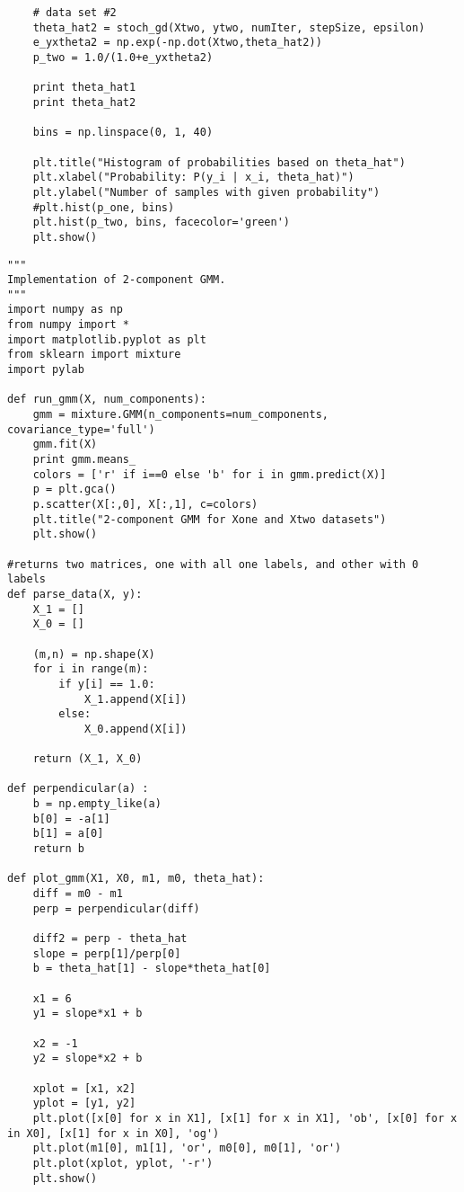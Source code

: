 \documentclass[11pt]{article}
\begin{document}
\begin{lstlisting}
    # data set #2
    theta_hat2 = stoch_gd(Xtwo, ytwo, numIter, stepSize, epsilon)
    e_yxtheta2 = np.exp(-np.dot(Xtwo,theta_hat2))
    p_two = 1.0/(1.0+e_yxtheta2)

    print theta_hat1
    print theta_hat2

    bins = np.linspace(0, 1, 40)

    plt.title("Histogram of probabilities based on theta_hat")
    plt.xlabel("Probability: P(y_i | x_i, theta_hat)")
    plt.ylabel("Number of samples with given probability")
    #plt.hist(p_one, bins)
    plt.hist(p_two, bins, facecolor='green')
    plt.show()
\end{lstlisting}

\begin{lstlisting}
"""
Implementation of 2-component GMM.
"""
import numpy as np
from numpy import *
import matplotlib.pyplot as plt
from sklearn import mixture
import pylab

def run_gmm(X, num_components):
    gmm = mixture.GMM(n_components=num_components, covariance_type='full')
    gmm.fit(X)
    print gmm.means_
    colors = ['r' if i==0 else 'b' for i in gmm.predict(X)]
    p = plt.gca()
    p.scatter(X[:,0], X[:,1], c=colors)
    plt.title("2-component GMM for Xone and Xtwo datasets")
    plt.show()

#returns two matrices, one with all one labels, and other with 0 labels
def parse_data(X, y):
    X_1 = []
    X_0 = []

    (m,n) = np.shape(X)
    for i in range(m):
        if y[i] == 1.0:
            X_1.append(X[i])
        else:
            X_0.append(X[i])

    return (X_1, X_0)

def perpendicular(a) :
    b = np.empty_like(a)
    b[0] = -a[1]
    b[1] = a[0]
    return b

def plot_gmm(X1, X0, m1, m0, theta_hat):
    diff = m0 - m1
    perp = perpendicular(diff)

    diff2 = perp - theta_hat
    slope = perp[1]/perp[0]
    b = theta_hat[1] - slope*theta_hat[0]

    x1 = 6
    y1 = slope*x1 + b

    x2 = -1
    y2 = slope*x2 + b

    xplot = [x1, x2]
    yplot = [y1, y2]
    plt.plot([x[0] for x in X1], [x[1] for x in X1], 'ob', [x[0] for x in X0], [x[1] for x in X0], 'og')
    plt.plot(m1[0], m1[1], 'or', m0[0], m0[1], 'or')
    plt.plot(xplot, yplot, '-r')
    plt.show()


\end{lstlisting}
\end{document}
